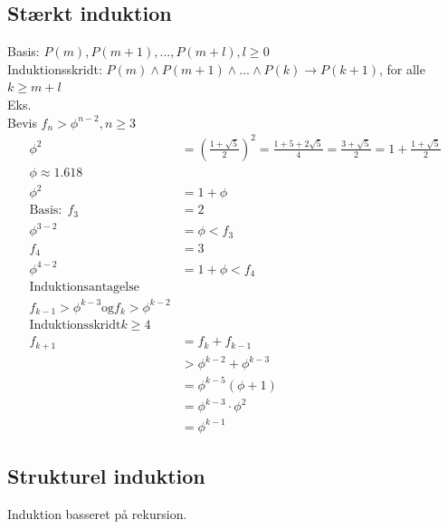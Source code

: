\documentclass[12pt, a4paper]{article}
\begin{document}
			\subsection{Stærkt induktion}
				Basis: $P(m), P(m+1),...,P(m+l), l\geq 0$\\
				Induktionsskridt: $P(m)\land P(m+1)\land ... \land P(k)\rightarrow P(k+1)$, for alle $k\geq m+l$\\
				Eks. \\
				Bevis $f_n>\phi^{n-2},n\geq 3$\\
				\begin{align*}
					\phi^2&=(\frac{1+\sqrt{5}}{2})^2=\frac{1+5+2\sqrt{5}}{4}=\frac{3+\sqrt{5}}{2}=1+\frac{1+\sqrt{5}}{2}\\
					\phi\approx 1.618\\
					\phi^2&=1+\phi\\
					\text{Basis}:\;f_3&=2\\
					\phi^{3-2}&=\phi<f_3\\
					f_4&=3\\
					\phi^{4-2}&=1+\phi<f_4\\[4mm]
					\text{Induktionsantagelse}\\
					f_{k-1}>\phi^{k-3}\text{og} f_k>\phi^{k-2}\\[4mm]
					\text{Induktionsskridt} k\geq 4\\
					f_{k+1}&=f_k+f_{k-1}\\
					&>\phi^{k-2}+\phi^{k-3}\\
					&=\phi^{k-5}(\phi+1)\\
					&=\phi^{k-3}\cdot \phi^2\\
					&=\phi^{k-1}
				\end{align*}
			\subsection{Strukturel induktion}
				Induktion basseret på rekursion.
\end{document}

